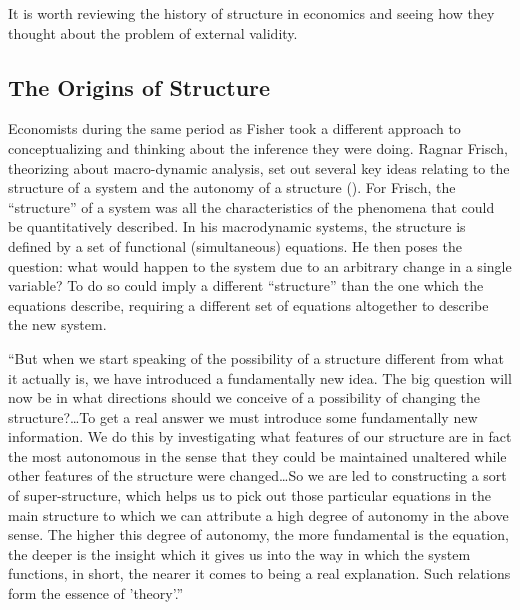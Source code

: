 \documentclass[a4paper,12pt]{article}
\begin{document}
It is worth reviewing the history of structure in economics and seeing how they thought about the problem of external validity.






\subsection*{The Origins of Structure}

Economists during the same period as Fisher took a different approach to conceptualizing and thinking about the inference they were doing. Ragnar Frisch, theorizing about macro-dynamic analysis, set out several key ideas relating to the structure of a system and the autonomy of a structure (\cite{Frisch1995}). For Frisch, the ``structure'' of a system was all the characteristics of the phenomena that could be quantitatively described. In his macrodynamic systems, the structure is defined by a set of functional (simultaneous) equations. He then poses the question: what would happen to the system due to an arbitrary change in a single variable? To do so could imply a different ``structure'' than the one which the equations describe, requiring a different set of equations altogether to describe the new system.

\begin{displayquote}
``But when we start speaking of the possibility of a structure different from what it actually is, we have introduced a fundamentally new idea. The big question will now be in what directions should we conceive of a possibility of changing the structure?\ldots To get a real answer we must introduce some fundamentally new information. We do this by investigating what features of our structure are in fact the most autonomous in the sense that they could be maintained unaltered while other features of the structure were changed\ldots So we are led to constructing a sort of super-structure, which helps us to pick out those particular equations in the main structure to which we can attribute a high degree of autonomy in the above sense. The higher this degree of autonomy, the more fundamental is the equation, the deeper is the insight which it gives us into the way in which the system functions, in short, the nearer it comes to being a real explanation. Such relations form the essence of 'theory'.''
\end{displayquote}
\end{document}
